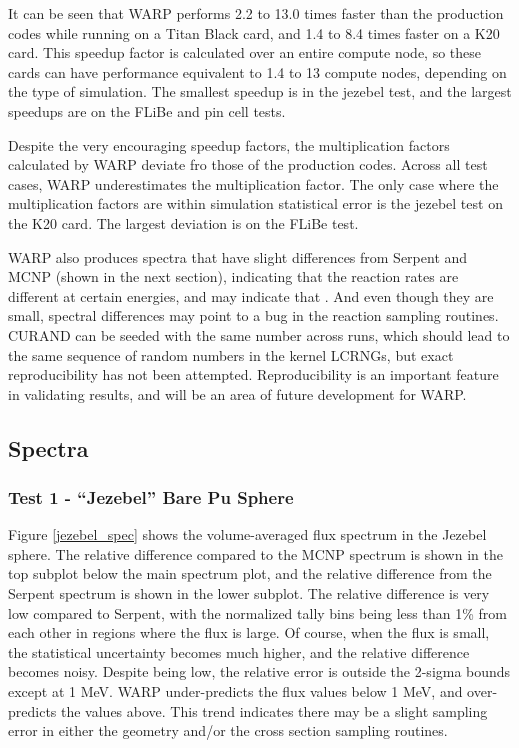 \documentclass[preprint,12pt]{elsarticle}
\begin{document}
It can be seen that WARP performs 2.2 to 13.0 times faster than the production codes while running on a Titan Black card, and 1.4 to 8.4 times faster on a K20 card.  This speedup factor is calculated over an entire compute node, so these cards can have performance equivalent to 1.4 to 13 compute nodes, depending on the type of simulation.   The smallest speedup is in the jezebel test, and the largest speedups are on the FLiBe and pin cell tests.

Despite the very encouraging speedup factors, the multiplication factors calculated by WARP deviate fro those of the production codes.  Across all test cases, WARP underestimates the multiplication factor.  The only case where the multiplication factors are within simulation statistical error is the jezebel test on the K20 card.  The largest deviation is on the FLiBe test.  

WARP also produces spectra that have slight differences from Serpent and MCNP (shown in the next section), indicating that the reaction rates are different at certain energies, and may indicate that .  And even though they are small, spectral differences may point to a bug in the reaction sampling routines.  CURAND can be seeded with the same number across runs, which should lead to the same sequence of random numbers in the kernel LCRNGs, but exact reproducibility has not been attempted.  Reproducibility is an important feature in validating results, and will be an area of future development for WARP.

\newpage
\subsection{Spectra}

\subsubsection{Test 1 - ``Jezebel'' Bare Pu Sphere}

Figure \ref{jezebel_spec} shows the volume-averaged flux spectrum in the Jezebel sphere.  The relative difference compared to the MCNP spectrum is shown in the top subplot below the main spectrum plot, and the relative difference from the Serpent spectrum is shown in the lower subplot.  The relative difference is very low compared to Serpent, with the normalized tally bins being less than 1\% from each other in regions where the flux is large.  Of course, when the flux is small, the statistical uncertainty becomes much higher, and the relative difference becomes noisy.   Despite being low, the relative error is outside the 2-sigma bounds except at 1 MeV.  WARP under-predicts the flux values below 1 MeV, and over-predicts the values above.  This trend indicates there may be a slight sampling error in either the geometry and/or the cross section sampling routines. 
\end{document}
